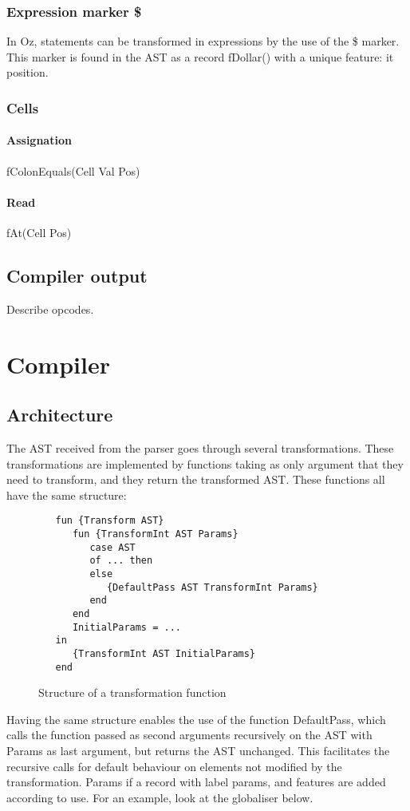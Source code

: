\documentclass[a4paper]{memoir}
\begin{document}
\subsection{Expression marker \$}
In Oz, statements can be transformed in expressions by the use of the \$ marker. This marker is found in the AST as a record fDollar() with a unique feature: it position.

\subsection{Cells}
\subsubsection{Assignation}
fColonEquals(Cell Val Pos) %
\subsubsection{Read}
fAt(Cell Pos) %
\section{Compiler output}
Describe opcodes.



\chapter{Compiler}
\section{Architecture}
The AST received from the parser goes through several transformations. These transformations are implemented by functions taking as only argument that they need to transform, and they return the transformed AST.
These functions all have the same structure:
\begin{figure}[h]
\begin{lstlisting}
   fun {Transform AST}
      fun {TransformInt AST Params}
         case AST
         of ... then
         else
            {DefaultPass AST TransformInt Params}
         end
      end
      InitialParams = ...
   in
      {TransformInt AST InitialParams}
   end
\end{lstlisting}
\caption{Structure of a transformation function}
\end{figure}
Having the same structure enables the use of the function DefaultPass, which calls the function passed as second arguments recursively on the AST with Params as last argument, but returns the AST unchanged. This facilitates the recursive calls for default behaviour on elements not modified by the transformation.
Params if a record with label params, and features are added according to use. For an example, look at the globaliser below.%
\end{document}
